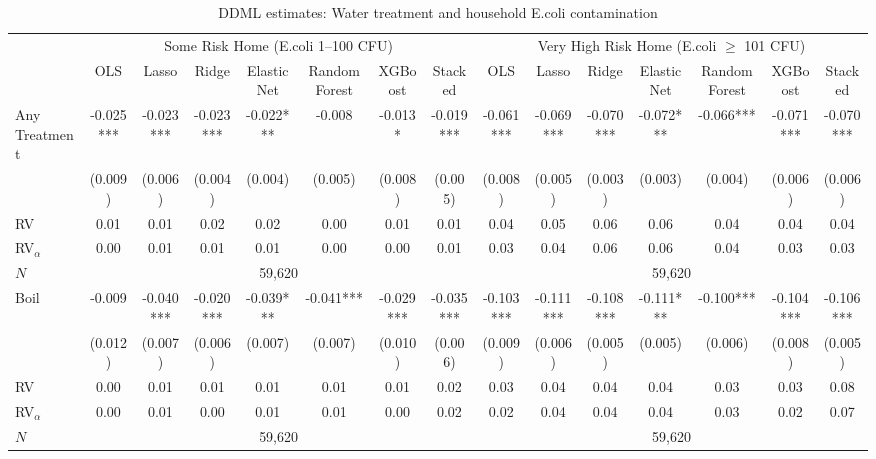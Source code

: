 \begin{landscape}
\begin{table}[htbp]
\centering
\caption{DDML estimates: Water treatment and household E.coli contamination}
\label{tab:results-ecoli}
\scriptsize
\setlength{\tabcolsep}{3pt}
\renewcommand{\arraystretch}{0.94}
\begin{adjustbox}{max width=\linewidth, max totalheight=0.70\textwidth, center}
\begin{tabular}{l|ccccccc|ccccccc}
\toprule
 & \multicolumn{7}{c|}{Some Risk Home (E.coli 1--100 CFU)} & \multicolumn{7}{c}{Very High Risk Home (E.coli $\geq$ 101 CFU)} \\
\cmidrule(lr){2-8} \cmidrule(lr){9-15}
 & OLS & Lasso & Ridge & Elastic Net & Random Forest & XGBoost & Stacked & OLS & Lasso & Ridge & Elastic Net & Random Forest & XGBoost & Stacked \\
\midrule
Any Treatment & -0.025*** & -0.023*** & -0.023*** & -0.022*** & -0.008 & -0.013* & -0.019*** & -0.061*** & -0.069*** & -0.070*** & -0.072*** & -0.066*** & -0.071*** & -0.070*** \\
 & (0.009) & (0.006) & (0.004) & (0.004) & (0.005) & (0.008) & (0.005) & (0.008) & (0.005) & (0.003) & (0.003) & (0.004) & (0.006) & (0.006) \\
\quad RV & 0.01 & 0.01 & 0.02 & 0.02 & 0.00 & 0.01 & 0.01 & 0.04 & 0.05 & 0.06 & 0.06 & 0.04 & 0.04 & 0.04 \\
\quad RV$_\alpha$ & 0.00 & 0.01 & 0.01 & 0.01 & 0.00 & 0.00 & 0.01 & 0.03 & 0.04 & 0.06 & 0.06 & 0.04 & 0.03 & 0.03 \\
\quad $N$ & \multicolumn{7}{c|}{59,620} & \multicolumn{7}{c}{59,620} \\
\midrule
Boil & -0.009 & -0.040*** & -0.020*** & -0.039*** & -0.041*** & -0.029*** & -0.035*** & -0.103*** & -0.111*** & -0.108*** & -0.111*** & -0.100*** & -0.104*** & -0.106*** \\
 & (0.012) & (0.007) & (0.006) & (0.007) & (0.007) & (0.010) & (0.006) & (0.009) & (0.006) & (0.005) & (0.005) & (0.006) & (0.008) & (0.005) \\
\quad RV & 0.00 & 0.01 & 0.01 & 0.01 & 0.01 & 0.01 & 0.02 & 0.03 & 0.04 & 0.04 & 0.04 & 0.03 & 0.03 & 0.08 \\
\quad RV$_\alpha$ & 0.00 & 0.01 & 0.00 & 0.01 & 0.01 & 0.00 & 0.02 & 0.02 & 0.04 & 0.04 & 0.04 & 0.03 & 0.02 & 0.07 \\
\quad $N$ & \multicolumn{7}{c|}{59,620} & \multicolumn{7}{c}{59,620} \\

\end{tabular}
\end{adjustbox}
\end{table}
\end{landscape}
